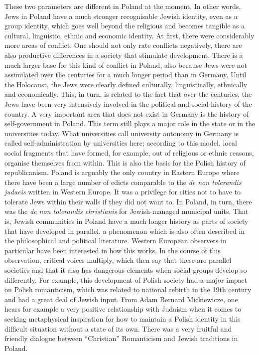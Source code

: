 These two parameters are different in Poland at the moment. In other words, Jews in Poland have a much stronger recognisable Jewish identity, even as a group identity, which goes well beyond the religious and becomes tangible as a cultural, linguistic, ethnic and economic identity. At first, there were considerably more areas of conflict. One should not only rate conflicts negatively, there are also productive differences in a society that stimulate development. There is a much larger base for this kind of conflict in Poland, also because Jews were not assimilated over the centuries for a much longer period than in Germany. Until the Holocaust, the Jews were clearly defined culturally, linguistically, ethnically and economically. This, in turn, is related to the fact that over the centuries, the Jews have been very intensively involved in the political and social history of the country. A very important area that does not exist in Germany is the history of self-government in Poland. This term still plays a major role in the state or in the universities today. What universities call university autonomy in Germany is called self-administration by universities here; according to this model, local social fragments that have formed, for example, out of religious or ethnic reasons, organise themselves from within. This is also the basis for the Polish history of republicanism. Poland is arguably the only country in Eastern Europe where there have been a large number of edicts comparable to the \textit{de non tolerandis judaeis} written in Western Europe. It was a privilege for cities not to have to tolerate Jews within their walls if they did not want to. In Poland, in turn, there was the \textit{de non tolerandis christianis} for Jewish-managed municipal units. That is, Jewish communities in Poland have a much longer history as parts of society that have developed in parallel, a phenomenon which is also often described in the philosophical and political literature. Western European observers in particular have been interested in how this works. In the course of this observation, critical voices multiply, which then say that these are parallel societies and that it also has dangerous elements when social groups develop so differently. For example, this development of Polish society had a major impact on Polish romanticism, which was related to national rebirth in the 19th century and had a great deal of Jewish input. From Adam Bernard Mickiewicze, one hears for example a very positive relationship with Judaism when it comes to seeking metaphysical inspiration for how to maintain a Polish identity in this difficult situation without a state of its own. There was a very fruitful and friendly dialogue between ``Christian'' Romanticism and Jewish traditions in Poland. \\

